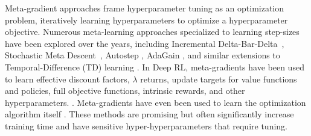 \documentclass[10pt]{article} %
\begin{document}

Meta-gradient approaches frame
hyperparameter tuning as an optimization problem, iteratively learning hyperparameters to optimize a hyperparameter
objective. Numerous meta-learning approaches specialized to learning step-sizes have been explored over the years, including Incremental Delta-Bar-Delta~\citep{sutton1992adapting}, Stochastic Meta Descent~\citep{schraudolph1999local}, Autostep \citep{mahmood2012tuning}, AdaGain \citep{jacobsen2019metadescent}, and similar extensions to Temporal-Difference
(TD) learning \citep{kearney2018tidbd,young2019metatrace,thill2015temporal}.
In Deep RL, meta-gradients have been used to learn effective discount factors, $\lambda$ returns, update targets for value
functions and policies, full objective functions, intrinsic rewards, and other hyperparameters.
\citep{xu2018meta,xu2020meta,oh2020discovering,kirsch2020improving,wang2020metasac,zheng2020what,bonnet2022debiasing,zahavy2020self,zheng2018learning}.
Meta-gradients have even been used to learn the optimization algorithm itself
\citep{andrychowicz2016learning,lan2024learning}. %
These methods are promising but often significantly increase training time and  have sensitive hyper-hyperparameters that require tuning.
\end{document}

